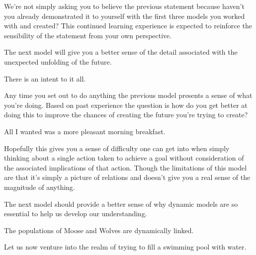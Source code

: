 \documentclass[]{memoir}
\begin{document}
We're not simply asking you to believe the previous statement because
haven't you already demonstrated it to yourself with the first three
models you worked with and created? This continued learning experience
is expected to reinforce the sensibility of the statement from your own
perspective.

The next model will give you a better sense of the detail associated
with the unexpected unfolding of the future.

\FloatBarrier 

\begin{model}[frametitle={Model: The future we create.}] 

 There is an intent to it all.




 \end{model}

Any time you set out to do anything the previous model presents a sense
of what you're doing. Based on past experience the question is how do
you get better at doing this to improve the chances of creating the
future you're trying to create?

\FloatBarrier 

\begin{model}[frametitle={Model: The bird feeder dilemma!}] 

 All I wanted was a more pleasant morning breakfast.




 \end{model}

Hopefully this gives you a sense of difficulty one can get into when
simply thinking about a single action taken to achieve a goal without
consideration of the associated implications of that action. Though the
limitations of this model are that it's simply a picture of relations
and doesn't give you a real sense of the magnitude of anything.

The next model should provide a better sense of why dynamic models are
so essential to help us develop our understanding.

\FloatBarrier 

\begin{model}[frametitle={Model: Moose and Wolves}] 

 The populations of Moose and Wolves are dynamically linked.




 \end{model}

Let us now venture into the realm of trying to fill a swimming pool with
water.
\end{document}
